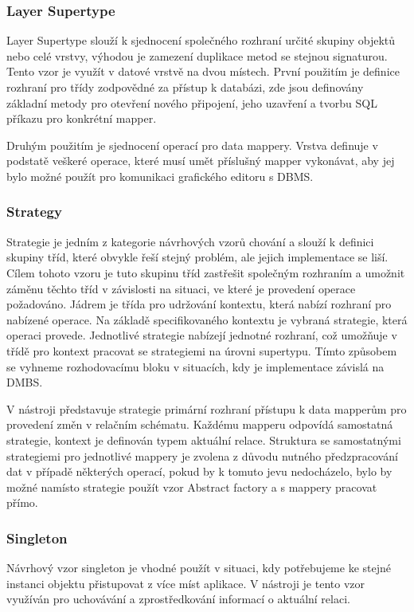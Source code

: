 \documentclass[czech,bachelor,public,dept460,male,oneside]{diploma}
\begin{document}
		\subsubsection{Layer Supertype}
		Layer Supertype slouží k sjednocení společného rozhraní určité skupiny objektů nebo celé vrstvy, výhodou je zamezení duplikace metod se stejnou signaturou. Tento vzor je využít v datové vrstvě na dvou místech. První použitím je definice rozhraní pro třídy zodpovědné za přístup k databázi, zde jsou definovány základní metody pro otevření nového připojení, jeho uzavření a tvorbu SQL příkazu pro konkrétní mapper. 
		
		Druhým použitím je sjednocení operací pro data mappery. Vrstva definuje v podstatě veškeré operace, které musí umět příslušný mapper vykonávat, aby jej bylo možné použít pro komunikaci grafického editoru s DBMS. 
	
		\subsubsection{Strategy} \label{secStrategy}
		Strategie je jedním z kategorie návrhových vzorů chování a slouží k definici skupiny tříd, které obvykle řeší stejný problém, ale jejich implementace se liší. Cílem tohoto vzoru je tuto skupinu tříd zastřešit společným rozhraním a umožnit záměnu těchto tříd v závislosti na situaci, ve které je provedení operace požadováno. Jádrem je třída pro udržování kontextu, která nabízí rozhraní pro nabízené operace. Na základě specifikovaného kontextu je vybraná strategie, která operaci provede. Jednotlivé strategie nabízejí jednotné rozhraní, což umožňuje v třídě pro kontext pracovat se strategiemi na úrovni supertypu. Tímto způsobem se vyhneme rozhodovacímu bloku v situacích, kdy je implementace závislá na DMBS.
		
		V nástroji představuje strategie primární rozhraní přístupu k data mapperům pro provedení změn v relačním schématu. Každému mapperu odpovídá samostatná strategie, kontext je definován typem aktuální relace. Struktura se samostatnými strategiemi pro jednotlivé mappery je zvolena z důvodu nutného předzpracování dat v případě některých operací, pokud by k tomuto jevu nedocházelo, bylo by možné namísto strategie použít vzor Abstract factory a s mappery pracovat přímo. 
		
		\subsubsection{Singleton}
		Návrhový vzor singleton je vhodné použít v situaci, kdy potřebujeme ke stejné instanci objektu přistupovat z více míst aplikace. V nástroji je tento vzor využíván pro uchovávání a zprostředkování informací o aktuální relaci. 
		
\end{document}
